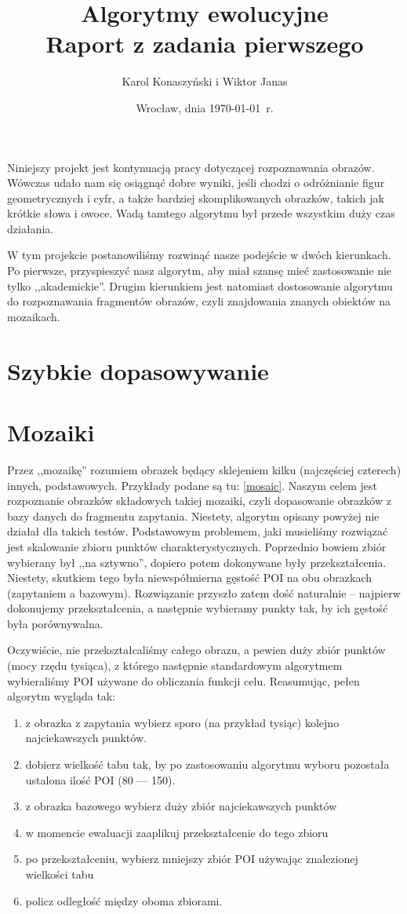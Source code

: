 \documentclass[a4paper,12pt,leqno]{article}
\title{\textbf{Algorytmy ewolucyjne}\\
       {\Large Raport z zadania pierwszego}\\[-1ex]}
\author{Karol Konaszyński i Wiktor Janas}
\date{Wrocław, dnia \today\ r.}
\begin{document}
\maketitle

Niniejszy projekt jest kontynuacją pracy dotyczącej rozpoznawania obrazów. Wówczas udało nam się osiągnąć dobre wyniki, jeśli chodzi o odróżnianie figur geometrycznych i cyfr, a także bardziej
skomplikowanych obrazków, takich jak krótkie słowa i owoce. Wadą tamtego algorytmu był przede wszystkim duży czas działania.

W tym projekcie postanowiliśmy rozwinąć nasze podejście w dwóch kierunkach. Po pierwsze, przyspieszyć nasz algorytm, aby miał szansę mieć zastosowanie nie tylko ,,akademickie''.
Drugim kierunkiem jest natomiast dostosowanie algorytmu do rozpoznawania fragmentów obrazów, czyli znajdowania znanych obiektów na mozaikach.

\section{Szybkie dopasowywanie}

\section{Mozaiki}

Przez ,,mozaikę'' rozumiem obrazek będący sklejeniem kilku (najczęściej czterech) innych, podstawowych. Przykłady podane są tu: \ref{mosaic}.
Naszym celem jest rozpoznanie obrazków składowych takiej mozaiki, czyli dopasowanie obrazków z bazy danych do fragmentu zapytania.
Niestety, algorytm opisany powyżej nie działał dla takich testów. Podstawowym problemem, jaki musieliśmy rozwiązać jest skalowanie zbioru punktów charakterystycznych. 
Poprzednio bowiem zbiór wybierany był ,,na sztywno'', dopiero potem dokonywane były przekształcenia. Niestety, skutkiem tego była niewspółmierna gęstość POI na obu obrazkach 
(zapytaniem a bazowym). Rozwiązanie przyszło zatem dość naturalnie -- najpierw dokonujemy przekształcenia, a następnie wybieramy punkty tak, by ich gęstość była porównywalna. 

Oczywiście, nie przekształcaliśmy całego obrazu, a pewien duży zbiór punktów (mocy rzędu tysiąca), z którego następnie standardowym algorytmem wybieraliśmy POI używane do obliczania funkcji celu.
Reasumując, pełen algorytm wygląda tak:
\begin{enumerate}
 \item z obrazka z zapytania wybierz sporo (na przykład tysiąc) kolejno najciekawszych punktów.
 \item dobierz wielkość tabu tak, by po zastosowaniu algorytmu wyboru pozostała ustalona ilość POI (80 --- 150).
 \item z obrazka bazowego wybierz duży zbiór najciekawszych punktów
 \item w momencie ewaluacji zaaplikuj przekształcenie do tego zbioru
 \item po przekształceniu, wybierz mniejszy zbiór POI używając znalezionej wielkości tabu
 \item policz odległość między oboma zbiorami.
\end{enumerate}
\end{document}
